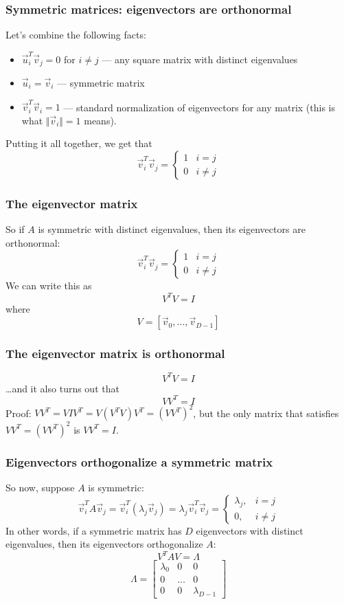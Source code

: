 \documentclass{beamer}
\begin{document}
\begin{frame}
  \frametitle{Symmetric matrices: eigenvectors are orthonormal}
  Let's combine the following facts:
  \begin{itemize}
  \item $\vec{u}_i^T\vec{v}_j=0$ for $i\ne j$ --- any square matrix with distinct
    eigenvalues
  \item $\vec{u}_i=\vec{v}_i$ --- symmetric matrix
  \item $\vec{v}_i^T\vec{v}_i=1$ --- standard normalization of
    eigenvectors for any matrix (this is what $\Vert\vec{v}_i\Vert=1$ means).
  \end{itemize}
  Putting it all together, we get that
  \[
  \vec{v}_i^T\vec{v}_j=
  \begin{cases}
    1&i=j\\
    0&i\ne j
  \end{cases}
  \]
\end{frame}

\begin{frame}
  \frametitle{The eigenvector matrix}
  So if $A$ is symmetric with distinct eigenvalues, then
  its eigenvectors  are orthonormal:
  \[
  \vec{v}_i^T\vec{v}_j=
  \begin{cases}
    1&i=j\\
    0&i\ne j
  \end{cases}
  \]
  We can  write this as
  \[
  V^TV = I
  \]
  where
  \[
  V=\left[\vec{v}_0,\ldots,\vec{v}_{D-1}\right]
  \]
\end{frame}

\begin{frame}
  \frametitle{The eigenvector matrix is orthonormal}
  \[
  V^TV = I
  \]
  \ldots and it also turns out that
  \[
  VV^T = I
  \]
  Proof: 
  $VV^T=VIV^T=V(V^TV)V^T=(VV^T)^2$, but the only matrix that satisfies
  $VV^T=(VV^T)^2$ is $VV^T=I$.
\end{frame}

\begin{frame}
  \frametitle{Eigenvectors orthogonalize a symmetric matrix}
  So now, suppose $A$ is symmetric:
  \[
  \vec{v}_i^TA\vec{v}_j=
  \vec{v}_i^T(\lambda_j\vec{v}_j)=\lambda_j\vec{v}_i^T\vec{v}_j
  =\begin{cases}\lambda_j,&i=j\\0,&i\ne j\end{cases}
  \]
  In other words, if a symmetric matrix has $D$ eigenvectors with
  distinct eigenvalues, then its eigenvectors orthogonalize $A$:
  \[
  V^TAV = \Lambda
  \]
  \[
  \Lambda=
  \left[\begin{array}{ccc}\lambda_0&0&0\\0&\ldots&0\\0&0&\lambda_{D-1}\end{array}\right]
  \]
\end{frame}
\end{document}
